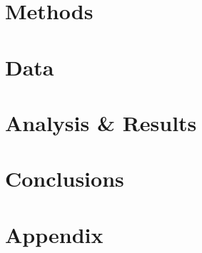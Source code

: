 \documentclass[hidelinks,11pt]{article} %
\begin{document}
	

\section{Methods}

	


\section{Data}

	

\section{Analysis \& Results}

	


\section{Conclusions}

	


\pagebreak
\section{Appendix}


\pagebreak

\printbibliography
\end{document}
